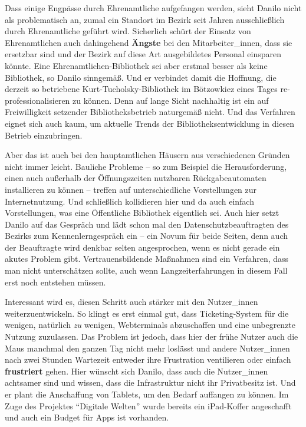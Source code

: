 \documentclass[a4paper,
fontsize=11pt,
oneside,
numbers=noperiodatend,
parskip=half-,
bibliography=totoc,
final
]{scrartcl}
\begin{document}
Dass einige Engpässe durch Ehrenamtliche aufgefangen werden, sieht
Danilo nicht als problematisch an, zumal ein Standort im Bezirk seit
Jahren ausschließlich durch Ehrenamtliche geführt wird. Sicherlich
schürt der Einsatz von Ehrenamtlichen auch dahingehend \textbf{Ängste}
bei den Mitarbeiter\_innen, dass sie ersetzbar sind und der Bezirk auf
diese Art ausgebildetes Personal einsparen könnte. Eine
Ehrenamtlichen-Bibliothek sei aber erstmal besser als keine Bibliothek,
so Danilo sinngemäß. Und er verbindet damit die Hoffnung, die derzeit so
betriebene Kurt-Tucholsky-Bibliothek im Bötzowkiez eines Tages
re-professionalisieren zu können. Denn auf lange Sicht nachhaltig ist
ein auf Freiwilligkeit setzender Bibliotheksbetrieb naturgemäß nicht.
Und das Verfahren eignet sich auch kaum, um aktuelle Trends der
Bibliotheksentwicklung in diesen Betrieb einzubringen.

Aber das ist auch bei den hauptamtlichen Häusern aus verschiedenen
Gründen nicht immer leicht. Bauliche Probleme -- so zum Beispiel die
Herausforderung, einen auch außerhalb der Öffnungszeiten nutzbaren
Rückgabeautomaten installieren zu können -- treffen auf unterschiedliche
Vorstellungen zur Internetnutzung. Und schließlich kollidieren hier und
da auch einfach Vorstellungen, was eine Öffentliche Bibliothek
eigentlich sei. Auch hier setzt Danilo auf das Gespräch und lädt schon
mal den Datenschutzbeauftragten des Bezirks zum Kennenlerngespräch ein
-- ein Novum für beide Seiten, denn auch der Beauftragte wird denkbar
selten angesprochen, wenn es nicht gerade ein akutes Problem gibt.
Vertrauensbildende Maßnahmen sind ein Verfahren, dass man nicht
unterschätzen sollte, auch wenn Langzeiterfahrungen in diesem Fall erst
noch entstehen müssen.

Interessant wird es, diesen Schritt auch stärker mit den Nutzer\_innen
weiterzuentwickeln. So klingt es erst einmal gut, dass Ticketing-System
für die wenigen, natürlich \emph{zu} wenigen, Webterminals abzuschaffen
und eine unbegrenzte Nutzung zuzulassen. Das Problem ist jedoch, dass
hier der frühe Nutzer auch die Maus manchmal den ganzen Tag nicht mehr
loslässt und andere Nutzer\_innen nach zwei Stunden Wartezeit entweder
ihre Frustration ventilieren oder einfach \textbf{frustriert} gehen.
Hier wünscht sich Danilo, dass auch die Nutzer\_innen achtsamer sind und
wissen, dass die Infrastruktur nicht ihr Privatbesitz ist. Und er plant
die Anschaffung von Tablets, um den Bedarf auffangen zu können. Im Zuge
des Projektes \enquote{Digitale Welten} wurde bereits ein iPad-Koffer
angeschafft und auch ein Budget für Apps ist vorhanden.
\end{document}
